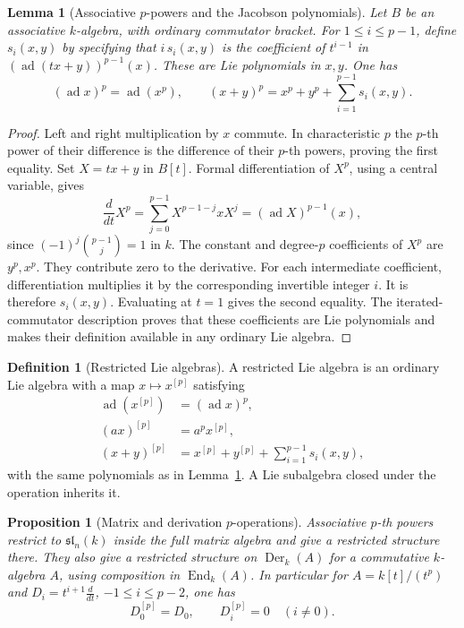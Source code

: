 \documentclass[11pt,oneside,openany]{book}
\newtheorem{lemma}[theorem]{Lemma}
\newtheorem{proposition}[theorem]{Proposition}
\theoremstyle{definition}
\newtheorem{definition}[theorem]{Definition}
\theoremstyle{remark}
\begin{document}
\begin{lemma}[Associative \(p\)-powers and the Jacobson polynomials]
\label{res:SR05}
Let \(B\) be an associative \(k\)-algebra, with ordinary
commutator bracket. For \(1\le i\le p-1\), define
\(s_i(x,y)\) by specifying that \(i\,s_i(x,y)\) is the
coefficient of \(t^{i-1}\) in
\((\operatorname{ad}(t x+y))^{p-1}(x)\).
These are Lie polynomials in \(x,y\). One has
\[
 (\operatorname{ad}x)^p=\operatorname{ad}(x^p),\qquad
 (x+y)^p=x^p+y^p+\sum_{i=1}^{p-1}s_i(x,y).
\]
\end{lemma}

\begin{proof}
Left and right multiplication by \(x\) commute.
In characteristic \(p\) the \(p\)-th power of their
difference is the difference of their \(p\)-th powers,
proving the first equality. Set \(X=t x+y\) in \(B[t]\).
Formal differentiation of \(X^p\), using a central variable,
gives
\[
 \frac{d}{dt}X^p=\sum_{j=0}^{p-1}X^{p-1-j}xX^j
          =(\operatorname{ad}X)^{p-1}(x),
\]
since \((-1)^j\binom{p-1}{j}=1\) in \(k\).
The constant and degree-\(p\) coefficients of \(X^p\)
are \(y^p,x^p\). They contribute zero to the derivative.
For each intermediate coefficient, differentiation
multiplies it by the corresponding invertible integer \(i\).
It is therefore \(s_i(x,y)\). Evaluating at \(t=1\)
gives the second equality. The iterated-commutator
description proves that these coefficients are Lie
polynomials and makes their definition available in any
ordinary Lie algebra.
\end{proof}

\begin{definition}[Restricted Lie algebras]
\label{res:SR06}
A restricted Lie algebra is an ordinary Lie algebra with a map
\(x\mapsto x^{[p]}\) satisfying
\[
\begin{aligned}
\operatorname{ad}(x^{[p]})&=(\operatorname{ad}x)^p,\\
(a x)^{[p]}&=a^p x^{[p]},\\
(x+y)^{[p]}&=x^{[p]}+y^{[p]}+\sum_{i=1}^{p-1}s_i(x,y),
\end{aligned}
\]
with the same polynomials as in Lemma~\ref{res:SR05}.
A Lie subalgebra closed under the operation inherits it.
\end{definition}

\begin{proposition}[Matrix and derivation \(p\)-operations]
\label{res:SR07}
Associative \(p\)-th powers restrict to \(\mathfrak{sl}_n(k)\)
inside the full matrix algebra and give a restricted
structure there. They also give a restricted structure on
\(\operatorname{Der}_k(A)\) for a commutative \(k\)-algebra \(A\),
using composition in \(\operatorname{End}_k(A)\).
In particular for \(A=k[t]/(t^p)\) and
\(D_i=t^{i+1}\frac{d}{dt}\), \(-1\le i\le p-2\), one has
\[
 D_0^{[p]}=D_0,\qquad D_i^{[p]}=0\quad(i\ne0).
\]
\end{proposition}
\end{document}
